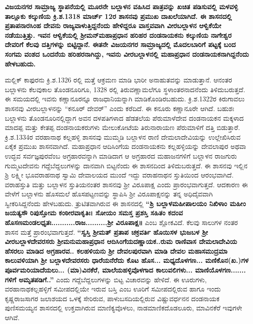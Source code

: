 \textbf{ವಿಜಯನಗರ ಸಾಮ್ರಾಜ್ಯ ಸ್ಥಾಪನೆಯಲ್ಲಿ ಮೂರನೇ ಬಲ್ಲಾಳನ ವಹಿಸಿದ ಪಾತ್ರವನ್ನು ಖಚಿತ ಪಡಿಸುವಲ್ಲಿ ಮಳವಳ್ಳಿ ತಾಲ್ಲೂಕು ಕಲ್ಕುಣಿಯ ಕ್ರಿ.ಶ.1318 ಮಾರ್ಚ್ 12ರ ಶಾಸನವು ಪ್ರಮುಖ ದಾಖಲೆಯಾಗಿದೆ. ಈ ಶಾಸನದಲ್ಲಿ ಪ್ರತಾಪನಾರಸಿಂಹ ದೇವನು ರಾಜ್ಯವಾಳುತ್ತಿದ್ದನೆಂದು ಹೇಳಿದ್ದರೂ ವಾಸ್ತವವಾಗಿ ವೀರಬಲ್ಲಾಳನ ಆಳ್ವಿಕೆಯೇ ನಡೆಯುತ್ತಿತ್ತು. ಇವನ ಆಳ್ವಿಕೆಯಲ್ಲಿ ಶ‍್ರೀಮನ್​ಮಹಾಪ್ರಧಾನ ಹರಿಹರ ದಂಡನಾಯಕನು ಕಲ್ಕುಣಿಯ ನಾಗೇಶ್ವರ ದೇವರಿಗೆ ಕೆಲವು ದತ್ತಿಗಳನ್ನು ಬಿಟ್ಟಿದ್ದಾನೆ. ಈತನೇ ವಿಜಯನಗರ ಸಾಮ್ರಾಜ್ಯದಲ್ಲಿ ಮೊದಲಬಾರಿಗೆ ಪಟ್ಟಕ್ಕೆ ಬಂದ ಸಂಗಮ ವಂಶದ ಒಂದನೆಯ ಹರಿಹರನಾಗಿದ್ದು, ಇವನು ವೀರಬಲ್ಲಾಳನಲ್ಲಿ ಮಹಾಪ್ರಧಾನ ದಂಡನಾಯಕನಾಗಿದ್ದನೆಂದು ಹೇಳಬಹುದು.}

ಮಲ್ಲಿಕ್​ ಕಾಫುರನು ಕ್ರಿ.ಶ.1326 ರಲ್ಲಿ ಮತ್ತೆ ಆಕ್ರಮಣ ಮಾಡಿ ಭಾರೀ ಅನಾಹುತವನ್ನು ಮಾಡುತ್ತಾನೆ. ಆನಂತರ ಬಲ್ಲಾಳನು ಕೆಲವುಕಾಲ ತೊಂಡನೂರಿಗೂ, 1328 ರಲ್ಲಿ ತಿರುವಣ್ಣಾಮಲೆಗೂ ಸ್ಥಳಾಂತರನಾದನೆಂದು ತಿಳಿದುಬರುತ್ತದೆ. ಈ ಸಮಯದಲ್ಲಿ ಇವನು ಕಣ್ಣಾನೂರನ್ನೂ ರಾಜಧಾನಿಯನ್ನಾಗಿ ಮಾಡಿಕೊಂಡಿರಬಹುದು. ಕ್ರಿ.ಶ.1322ರ ಕಿರುಗಾವಲು ಶಾಸನವು ವೀರಬಲ್ಲಾಳನನ್ನು “ಕನೂರ್​ ದೇವರ್​” ಎಂದು ಕರೆದಿದೆ. ಈ ಕನೂರು ಕಣ್ಣಾನೂರೇ ಆಗಿದೆ. ಬಹುಶಃ ಬಲ್ಲಾಳನು ತೊಂಡನೂರಿನಲ್ಲಿದ್ದಾಗ ಅವನ ದಳಪತಿಗಳಾದ ಹೆಡತಲೆಯ ಪೆರುಮಾಳೆದೇವ ದಂಡನಾಯಕನ ಮಕ್ಕಳಾದ ಮಾದಪ್ಪ ಮತ್ತು ಕೇತಪ್ಪ ದಂಡನಾಯಕರುಗಳು ಮೇಲುಕೋಟೆಯ ತಿರುನಾರಾಯಣ ಪೆರುಮಾಳಿಗೆ ದತ್ತಿ ಬಿಡುತ್ತಾರೆ. ಕ್ರಿ.ಶ.1334ರ ವರಹಾನಾಥ ಕಲ್ಲಹಳ್ಳಿ ಶಾಸನವು ಮುಮ್ಮಡಿ ಬಲ್ಲಾಳನ ರಾಣಿ ದೇಮಲಾದೇವಿಯನ್ನು ಉಲ್ಲೇಖಿಸಿರುವ ಏಕೈಕ ಪ್ರಮುಖ ಶಾಸನವಾಗಿದೆ. ಮಹಾಪ್ರಧಾನ ಆದಿಸಿಂಗೆಯ ದಂಡನಾಯಕನು ಕಲ್ಲಹಳ್ಳಿಯನ್ನು ದೇವಲಾಪುರ ಅಥವಾ ಉದ್ಭವ ಸರ್ವಜ್ಞಪುರವೆಂಬ ಅಗ್ರಹಾರವನ್ನಾಗಿ ಮಾಡಿದಾಗ ಆ ಅಗ್ರಹಾರದ ಮಹಾಜನಗಳಿಗೆ ಬಲ್ಲಾಳನ ರಾಜಗುರು ಗುಮ್ಮಟದೇವನು ಗದ್ದೆಬೆದ್ದಲುಗಳನ್ನು ದಾನವಾಗಿ ಬಿಟ್ಟನೆಂದು ಈ ಶಾಸನದಿಂದ ತಿಳಿದುಬರುತ್ತದೆ. ಈ ಶಾಸನವು ಇಲ್ಲಿನ ಶ್ರಿ ಲಕ್ಷ್ಮೀ ಭೂವರಾಹನಾಥ ಸ್ವಾಮಿ ದೇವಾಲಯದ ಮುಂದೆ ಇದ್ದು ವರಾಹನಾಥನ ಸ್ತುತಿಯಿಂದ ಆರಂಭವಾಗಿದೆ. ವರಾಹಸ್ತುತಿ ಮತ್ತು ಬಲ್ಲಾಳನ ಸ್ತುತಿಯನಂತರ ಶಾಸನವು ಶ‍್ರೀ ವಿರೂಪಾಕ್ಷ ಎಂದು ಪ್ರಾರಂಭವಾಗುತ್ತದೆ. ಆದಕಾರಣ ಈ ವೇಳೆಗೆ ಬಲ್ಲಾಳನು ಹೊಸಮಲೆ ಹೊಸಪಟ್ಟಣವನ್ನು ಸ್ಥಾಪಿಸಿ ಶ‍್ರೀ ವಿರೂಪಾಕ್ಷನನ್ನು ತನ್ನ ಅಧಿದೈವವಾಗಿ ಸ್ವೀಕರಿಸಿದ್ದನೆಂದು ಹೇಳಬಹುದು. ತ್ರುಟಿತವಾಗಿರುವ ಈ ಶಾಸನದಲ್ಲಿ \textbf{“ಶ್ರಿ ಬಲ್ಲಾಳಮಹೀಪಾಲಯಂ ನಿಖಿಳಾಂ ಮಹೀಂ ಜಯತ್ಯಸೌ ರಿಪುಸ್ತೋಮ ಕಂಠೀರವಾಕೃತಿಃ। ಸೋಯಂ ಸಮಸ್ತ ಪ್ರಶಸ್ತಿ ಸಹಿತಂ ಕದಂವ ಹೊಸಣಮಂಡಲಧೃತಃ...........ರಾಜ..........ಶ‍್ರೀ ವಿರೂಪಾಕ್ಷ॥} ಎಂಬ ಶ್ಲೋಕವಿದೆ. ಕೆಲವು ಸಾಲುಗಳ ನಂತರ ಶಾಸನ ಮತ್ತೆ ಪ್ರಾರಂಭವಾಗುತ್ತದೆ. \textbf{“ಸ್ವಸ್ತಿ ಶ‍್ರೀಮತ್​ ಪ್ರತಾಪ ಚಕ್ರವರ್ತಿ ಹೊಯಿಸಳ ಭುಜಬಳ ಶ‍್ರೀ ವೀರಬಲ್ಲಾಳದೇವರಸರು ಶ‍್ರೀಮನುಮಹಾಪ್ರಧಾನ ಆದಿಸಿಂಗೆಯದಣ್ಣಾಯಕ..ರುಮ ರಾಣಿವಾಸ ದೇಮಲಾದೇವಿಯ ಹೆಸರಲು ಮಾಡಿದ ಅಗ್ರಹಾರವ.. ಕಲಹಳಿಯನು ಶ‍್ರೀ ದೇವಲಪುರವಾಗಿ ಮಾಡಿ ದೇವಲ ಮಹಾಸಮುದ್ರಮಾ ಕಾಲುವಳಿಯಾಗಿ ಶ‍್ರೀ ಬಲ್ಲಾಳದೇವರಸರು ಧಾರೆಯನೆರೆದು ಕೊಟ ಹೊಸ... ಮಧ್ಯದೊಳಗಣ... ಮಣಿಕೊನ(ಖ.)ಗಳ ಪೂರ್ವಮರಿಯಾದೆಯಲು... (ಮಾ)ವಿನಕೆರೆ, ಮಾಲೆಯಹಳ್ಳಿವೊಳಗಾದ ಕಾಲುವಲಿಗಳು... ಮಾಣಿಯೊಳಗಣ....... ಗಳಿಗೆ ಅಮೃತಪಡಿಗೆ..”} ಎಂದು ಗದ್ದೆಬೆದ್ದಲುಗಳನ್ನು ಬಿಟ್ಟ ವಿಚಾರವನ್ನು ಹೇಳಿದೆ. ಈ ಊರುಗಳು, ವರಹಾನಾಥಕಲ್ಲಹಳ್ಳಿಗೆ ಸಮೀಪದಲ್ಲಿಯೇ ಇರುವ ಬಸ್ತಿ ಎಂಬ ಊರಿಗೆ ಸಮೀಪದಲ್ಲಿರುವ ಹಾಗೂ ಇಂದು ಕೃಷ್ಣರಾಜಸಾಗರ ಜಲಾಶಯದ ಒಳಕ್ಕೆ ಸೇರಿರುವ, ಪಾಳುಬಸದಿಯಲ್ಲಿರುವ ವಿಷ್ಣುವರ್ಧನನ ದಂಡನಾಯಕ ಪುಣಿಸಮಯ್ಯನ ಶಾಸನದಲ್ಲಿ ಉಕ್ತವಾಗಿರುವ ಮಾಣಿಕ್ಯವೊಳಲು, ನಾಡಮಾಣಿಕದೊಡಲೂರು, ಮಾವಿನಕೆರೆ ಇವುಗಳೇ ಆಗಿವೆ.

